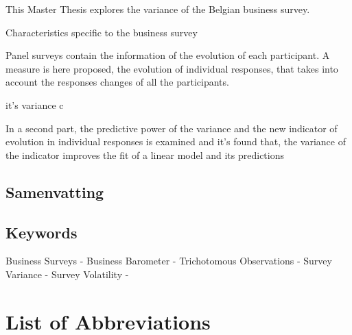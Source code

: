 \documentclass[12pt,a4paper,oneside]{book}
\begin{document}
This Master Thesis explores the variance of the Belgian business survey.

Characteristics specific to the business survey

Panel surveys contain the information of the evolution of each participant. A measure is here proposed, the evolution of individual responses, that takes into account the responses changes of all the participants.

it's variance c

In a second part, the predictive power of the variance and the new indicator of evolution in individual responses is examined and it's found that, the variance of the indicator improves the fit of a linear model and its predictions


\section*{Samenvatting}

\lipsum[1]


\section*{Keywords}
Business Surveys - 
Business Barometer -
Trichotomous Observations -
Survey Variance - 
Survey Volatility -


\chapter*{List of Abbreviations}
\end{document}
